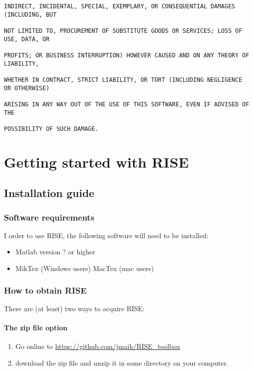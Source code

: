 \documentclass[letterpaper,10pt,english]{sphinxmanual}
\begin{document}
\begin{Verbatim}[commandchars=\\\{\}]
INDIRECT, INCIDENTAL, SPECIAL, EXEMPLARY, OR CONSEQUENTIAL DAMAGES (INCLUDING, BUT

NOT LIMITED TO, PROCUREMENT OF SUBSTITUTE GOODS OR SERVICES; LOSS OF USE, DATA, OR

PROFITS; OR BUSINESS INTERRUPTION) HOWEVER CAUSED AND ON ANY THEORY OF LIABILITY,

WHETHER IN CONTRACT, STRICT LIABILITY, OR TORT (INCLUDING NEGLIGENCE OR OTHERWISE)

ARISING IN ANY WAY OUT OF THE USE OF THIS SOFTWARE, EVEN IF ADVISED OF THE

POSSIBILITY OF SUCH DAMAGE.
\end{Verbatim}


\chapter{Getting started with RISE}
\label{getting_started:getting-started-with-rise}\label{getting_started::doc}

\section{Installation guide}
\label{getting_started_folder/installation_configuration::doc}\label{getting_started_folder/installation_configuration:installation-guide}

\subsection{Software requirements}
\label{getting_started_folder/installation_configuration:software-requirements}
I order to use RISE, the following software will need to be installed:
\begin{itemize}
\item {} 
Matlab version ? or higher

\item {} 
MikTex (Windows users) MacTex (mac users)

\end{itemize}


\subsection{How to obtain RISE}
\label{getting_started_folder/installation_configuration:how-to-obtain-rise}
There are (at least) two ways to acquire RISE:


\subsubsection{The zip file option}
\label{getting_started_folder/installation_configuration:the-zip-file-option}\begin{enumerate}
\item {} 
Go online to \href{https://github.com/jmaih/RISE\_toolbox}{https://github.com/jmaih/RISE\_toolbox}

\item {} 
download the zip file and unzip it in some directory on your
computer.

\end{enumerate}
\end{document}
